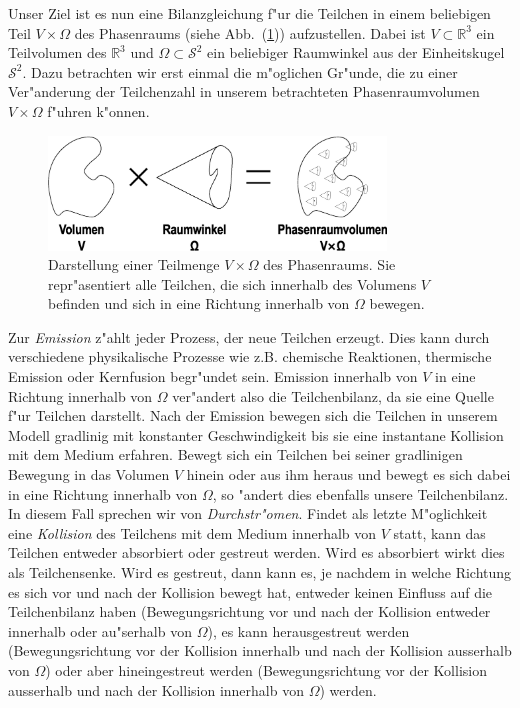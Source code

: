 	Unser Ziel ist es nun eine Bilanzgleichung f"ur die Teilchen in einem beliebigen Teil $V \times \Omega$ des Phasenraums (siehe Abb.~(\ref{fig:phasespacevolume})) aufzustellen. Dabei ist $V \subset \mathbb{R}^3$ ein Teilvolumen des $\mathbb{R}^3$ und $\Omega \subset \mathcal{S}^2$ ein beliebiger Raumwinkel aus der Einheitskugel $\mathcal{S}^2$. Dazu betrachten wir erst einmal die m"oglichen Gr"unde, die zu einer Ver"anderung der Teilchenzahl in unserem betrachteten Phasenraumvolumen $V \times \Omega$ f"uhren k"onnen.
	\begin{figure}
		\centering
		\includegraphics[width=0.8\textwidth]{phasespacevolume.eps}
		\caption{Darstellung einer Teilmenge $V \times \Omega$ des Phasenraums. Sie repr"asentiert alle Teilchen, die sich innerhalb des Volumens $V$ befinden und sich in eine Richtung innerhalb von $\Omega$ bewegen.}
		\label{fig:phasespacevolume}
	\end{figure}

	Zur {\em Emission} z"ahlt jeder Prozess, der neue Teilchen erzeugt. Dies kann durch verschiedene physikalische Prozesse wie z.B. chemische Reaktionen, thermische Emission oder Kernfusion begr"undet sein. Emission innerhalb von $V$ in eine Richtung innerhalb von $\Omega$ ver"andert also die Teilchenbilanz, da sie eine Quelle f"ur Teilchen darstellt. Nach der Emission bewegen sich die Teilchen in unserem Modell gradlinig mit konstanter Geschwindigkeit bis sie eine instantane Kollision mit dem Medium erfahren. Bewegt sich ein Teilchen bei seiner gradlinigen Bewegung in das Volumen $V$ hinein oder aus ihm heraus und bewegt es sich dabei in eine Richtung innerhalb von $\Omega$, so "andert dies ebenfalls unsere Teilchenbilanz. In diesem Fall sprechen wir von {\em Durchstr"omen}. Findet als letzte M"oglichkeit eine {\em Kollision} des Teilchens mit dem Medium innerhalb von $V$ statt, kann das Teilchen entweder absorbiert oder gestreut werden. Wird es absorbiert wirkt dies als Teilchensenke. Wird es gestreut, dann kann es, je nachdem in welche Richtung es sich vor und nach der Kollision bewegt hat, entweder keinen Einfluss auf die Teilchenbilanz haben (Bewegungsrichtung vor und nach der Kollision entweder innerhalb oder au"serhalb von $\Omega$), es kann herausgestreut werden (Bewegungsrichtung vor der Kollision innerhalb und nach der Kollision ausserhalb von $\Omega$) oder aber hineingestreut werden (Bewegungsrichtung vor der Kollision ausserhalb und nach der Kollision innerhalb von $\Omega$) werden.
	
